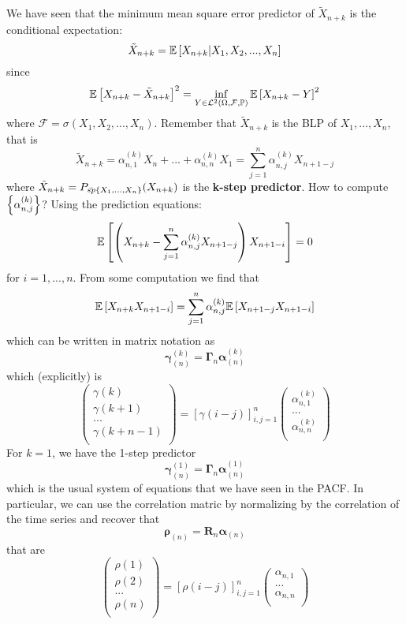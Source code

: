 We have seen that the minimum mean square error predictor of $\tilde{X}_{n+k}$ is the conditional expectation:
\[
    \tilde{X}_{n+k}=\mathbb{E}\left[X_{n+k}|X_1,X_2,...,X_n\right]  
\]
since
\[
    \mathbb{E}\left[X_{n+k}-\tilde{X}_{n+k}\right]^2=\inf_{Y\in\mathcal{L}^{2}(\Omega,\mathcal{F},\mathbb{P})}\mathbb{E}\left[X_{n+k}-Y\right]^2
\]
where $\mathcal{F}=\sigma(X_1,X_2,...,X_n)$. Remember that $\tilde{X}_{n+k}$ is the BLP of $X_1,...,X_n$, that is
\[
    \tilde{X}_{n+k}=\alpha_{n,1}^{(k)}X_n+...+\alpha_{n,n}^{(k)}X_1=\sum_{j=1}^n\alpha_{n,j}^{(k)}X_{n+1-j}
\]
where $\tilde{X}_{n+k}=P_{\bar{sp}\left\{X_1,...,X_n\right\}}(X_{n+k})$ is the \textbf{k-step predictor}. How to compute $\left\{\alpha_{n,j}^{(k)}\right\}$? Using the prediction equations:
\[
    \mathbb{E}\left[\left(X_{n+k}-\sum_{j=1}^n\alpha_{n,j}^{(k)}X_{n+1-j}\right)X_{n+1-i}\right]=0  
\]
for $i=1,...,n$. From some computation we find that
\[
    \mathbb{E}\left[X_{n+k}X_{n+1-i}\right]=\sum_{j=1}^n\alpha_{n,j}^{(k)}\mathbb{E}\left[X_{n+1-j}X_{n+1-i}\right]  
\]
which can be written in matrix notation as
\[
    \boldsymbol{\gamma}_{(n)}^{(k)}=\boldsymbol{\Gamma}_n\boldsymbol{\alpha}_{(n)}^{(k)}  
\]
which (explicitly) is
\[
    \begin{pmatrix}
        \gamma(k)\\
        \gamma(k+1)\\
        ...\\
        \gamma(k+n-1)\\
    \end{pmatrix}
    =
    \left[\gamma(i-j)\right]_{i,j=1}^n
    \begin{pmatrix}
        \alpha_{n,1}^{(k)}\\
        ...\\
        \alpha_{n,n}^{(k)}\\
    \end{pmatrix}
\]
For $k=1$, we have the 1-step predictor
\[
    \boldsymbol{\gamma}_{(n)}^{(1)}=\boldsymbol{\Gamma}_n\boldsymbol{\alpha}_{(n)}^{(1)}
\]
which is the usual system of equations that we have seen in the PACF. In particular, we can use the correlation matric by normalizing by the correlation of the time series and recover that
\[
    \boldsymbol{\rho}_{(n)}=\boldsymbol{R}_n\boldsymbol{\alpha}_{(n)}  
\]
that are
\[
    \begin{pmatrix}
        \rho(1)\\
        \rho(2)\\
        ...\\
        \rho(n)\\
    \end{pmatrix}
    =
    \left[\rho(i-j)\right]_{i,j=1}^n
    \begin{pmatrix}
        \alpha_{n,1}\\
        ...\\
        \alpha_{n,n}\\
    \end{pmatrix}
\]
